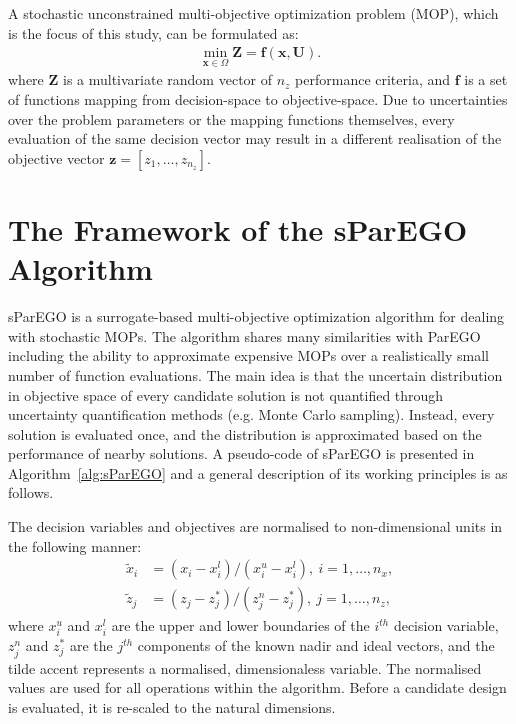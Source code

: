 \documentclass{llncs}
\newcommand{\brr}[1]{{\left({#1}\right)}} %
\newcommand{\vx}{\mathbf{x}} %
\newcommand{\vf}{\mathbf{f}} %
\newcommand{\vz}{\mathbf{z}} %
\newcommand{\vZ}{\mathbf{Z}} %
\newcommand{\vU}{\mathbf{U}} %
\begin{document}
A stochastic unconstrained multi-objective optimization problem (MOP), which is the focus of this study, can be formulated as:
\begin{align}
\label{eq:mop}
	\min_{\vx\in\Omega} \vZ=\vf\brr{\vx, \vU}.
\end{align}
where $\vZ$ is a multivariate random vector of $n_z$ performance criteria, and $\vf$ is a set of functions mapping from decision-space to objective-space. Due to uncertainties over the problem parameters or the mapping functions themselves, every evaluation of the same decision vector may result in a different realisation of the objective vector $\vz=[z_1,\ldots,z_{n_z}]$.

\section{The Framework of the sParEGO Algorithm}\label{sec:framework}


sParEGO is a surrogate-based multi-objective optimization algorithm for dealing with stochastic MOPs. The algorithm shares many similarities with ParEGO including the ability to approximate expensive MOPs over a realistically small number of function evaluations. The main idea is that the uncertain distribution in objective space of every candidate solution is not quantified through uncertainty quantification methods (e.g. Monte Carlo sampling). Instead, every solution is evaluated once, and the distribution is approximated based on the performance of nearby solutions. A pseudo-code of sParEGO is presented in Algorithm~\ref{alg:sParEGO} and a general description of its working principles is as follows.

The decision variables and objectives are normalised to non-dimensional units in the following manner:
\begin{align}
 \tilde{x}_i &= (x_i-x_i^l)/(x_i^u - x_i^l),~i=1,\ldots,n_x,\\
 \tilde{z}_j &= (z_j-z_j^*)/(z_j^n - z_j^*),~j=1,\ldots,n_z,
\end{align}
where $x_i^u$ and $x_i^l$ are the upper and lower boundaries of the $i^{th}$ decision variable, $z_j^n$ and $z_j^*$ are the $j^{th}$ components of the known nadir and ideal vectors, and the tilde accent represents a normalised, dimensionaless variable. The normalised values are used for all operations within the algorithm. Before a candidate design is evaluated, it is re-scaled to the natural dimensions.
\end{document}
